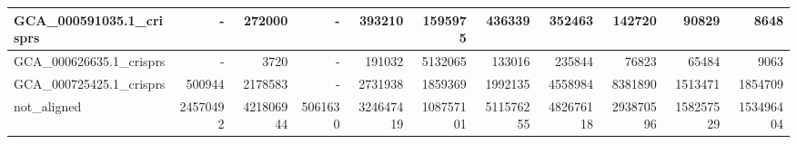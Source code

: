 \documentclass[12pt,a4paper]{article}
\begin{document}
\begin{table}[ht]
\begin{center}
\begin{tabular}{|l*{10}{|r}|}
GCA\_000591035.1\_crisprs & - & 272000 & - & 393210 & 1595975 & 436339 & 352463 & 142720 & 90829 & 8648 \\ \hline
GCA\_000626635.1\_crisprs & - & 3720 & - & 191032 & 5132065 & 133016 & 235844 & 76823 & 65484 & 9063 \\ \hline
GCA\_000725425.1\_crisprs & 500944 & 2178583 & - & 2731938 & 1859369 & 1992135 & 4558984 & 8381890 & 1513471 & 1854709 \\ \hline
not\_aligned & 24570492 & 421806944 & 5061630 & 324647419 & 108757101 & 511576255 & 482676118 & 293870596 & 158257529 & 153496404 \\ \hline
\end{tabular}
\end{center}
\end{table}
\end{document}
